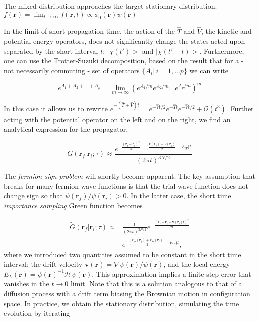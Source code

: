 The mixed distribution approaches the target stationary distribution: $f(\bm r) = \lim_{t\rightarrow \infty} f(\bm r, t) \propto \phi_0(\bm r) \psi (\bm r) $

In the limit of short propagation time, the action of the $\hat T$ and $\hat V$, the kinetic and potential energy operators, does not significantly change the states acted upon separated by the short interval $t$: $| \chi (t') >$ and $|\chi (t'+t) >$. Furthermore, one can use the Trotter-Suzuki decomposition, based on the result that for a - not necessarily commuting - set of operators $\{A_i | \, i = 1,...p\}$  we can write

\begin{equation}
e^{A_1 + A_2 + ... + A_p} = \lim_{m\rightarrow \infty} ( e^{A_1/m}e^{A_2/m}...e^{A_p/m})^m
\end{equation}

In this case it allows us to rewrite $e^{-(\hat T + \hat V) t} = e^{-\hat V t/2} e^{-\hat T t} e^{-\hat V t/2} + \mathcal{O}(t^3) $. Further acting with the potential operator on the left and on the right, we find an analytical expression for the propagator.

\begin{equation}
G(\bm r_f | \bm r_i ; \tau) \approx \frac{e^{-\frac{(\bm r_f - \bm r_i)^2}{2t} -\big( \frac{V(\bm r_f) + V(\bm r_i)}{2} - E_T \big) t}}{(2\pi t)^{3N/2}} 
\end{equation}

The \emph{fermion sign problem} will shortly become apparent. The key assumption that breaks for many-fermion wave functions is that the trial wave function does not change sign so that $\psi (\bm r_f) / \psi (\bm r_i) > 0$. In the latter case, the short time \emph{importance sampling} Green function becomes

\begin{equation}
\begin{split}
\tilde{G}(\bm r_f | \bm r_i ; \tau) \approx & \frac{1}{(2\pi t)^{3N/2}} e^{-\frac{(\bm r_f - \bm r_i - \bm v(\bm r_i)t )^2}{2t}} \\
&e^{-\big( \frac{E_L(\bm r_f) + E_L(\bm r_i)}{2} - E_T \big) t} ,
\end{split}
\end{equation}
where we introduced two quantities assumed to be constant in the short time interval: the drift velocity $\bm v(\bm r) = \nabla \psi (\bm r) / \psi (\bm r)$, and the local energy $E_L (\bm r) = \psi (\bm r)^{-1} \mathcal{H} \psi (\bm r)$. This approximation implies a finite step error that vanishes in the $t \rightarrow 0$ limit. Note that this is a solution analogous to that of a diffusion process with a drift term biasing the Brownian motion in configuration space. In practice, we obtain the stationary distribution, simulating the time evolution by iterating

